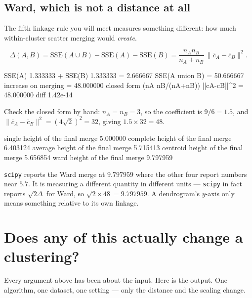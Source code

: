 \documentclass[11pt]{article}
\begin{document}
\subsection{Ward, which is not a distance at all}

The fifth linkage rule you will meet measures something different: how much
within-cluster scatter merging would \emph{create}.

\begin{equation}
  \Delta(A,B) = \mathrm{SSE}(A \cup B) - \mathrm{SSE}(A) - \mathrm{SSE}(B)
  = \frac{n_A n_B}{n_A + n_B}\,\|\bar{c}_A - \bar{c}_B\|^2.
  \label{eq:ward}
\end{equation}

\begin{codeout}
SSE(A) 1.333333 + SSE(B) 1.333333 = 2.666667
SSE(A union B)                = 50.666667
increase on merging           = 48.000000
closed form (nA nB/(nA+nB)) ||cA-cB||^2 = 48.000000   diff 1.42e-14
\end{codeout}

Check the closed form by hand: $n_A = n_B = 3$, so the coefficient is
$9/6 = 1.5$, and $\|\bar{c}_A - \bar{c}_B\|^2 = (4\sqrt2)^2 = 32$, giving
$1.5 \times 32 = 48$.

\begin{codeout}
single    height of the final merge  5.000000
complete  height of the final merge  6.403124
average   height of the final merge  5.715413
centroid  height of the final merge  5.656854
ward      height of the final merge  9.797959
\end{codeout}

\begin{caution}
\texttt{scipy} reports the Ward merge at $9.797959$ where the other four
report numbers near $5.7$. It is measuring a different quantity in different
units --- \texttt{scipy} in fact reports $\sqrt{2\Delta}$ for Ward, so
$\sqrt{2 \times 48} = 9.797959$. A dendrogram's $y$-axis only means something
relative to its own linkage.
\end{caution}

\section{Does any of this actually change a clustering?}
\label{sec:realdata}

Every argument above has been about the input. Here is the output. One
algorithm, one dataset, one setting --- only the distance and the scaling
change.
\end{document}
